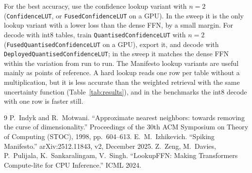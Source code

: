 \documentclass[11pt]{article}
\DeclareRobustCommand{\code}[1]{{\renewcommand{\_}{\textunderscore\allowbreak}\texttt{#1}}}
\begin{document}
For the best accuracy, use the confidence lookup variant with $n=2$ (\code{ConfidenceLUT}, or
\code{FusedConfidenceLUT} on a GPU). In the sweep it is the only lookup variant with a lower loss than the
dense FFN, by a small margin. For decode with int8 tables, train \code{QuantisedConfidenceLUT} with $n=2$
(\code{FusedQuantisedConfidenceLUT} on a GPU), export it, and decode with
\code{DeployedQuantisedConfidenceLUT}; in the sweep it matches the dense FFN within the variation from run
to run. The Manifesto lookup variants are useful mainly as points of reference. A hard lookup reads one
row per table without a multiplication, but it is less accurate than the weighted retrieval with the same
uncertainty function (Table~\ref{tab:results}), and in the benchmarks the int8 decode with one row is
faster still.

\begin{thebibliography}{9}\small\setlength{\itemsep}{1pt}
 P.~Indyk and R.~Motwani. ``Approximate nearest neighbors: towards removing the curse of
  dimensionality.'' Proceedings of the 30th ACM Symposium on Theory of Computing (STOC), 1998,
  pp.~604--613.
 E.~M.~Izhikevich. ``Spiking Manifesto.'' arXiv:2512.11843, v2, December 2025.
 Z.~Zeng, M.~Davies, P.~Pulijala, K.~Sankaralingam, V.~Singh. ``LookupFFN: Making
  Transformers Compute-lite for CPU Inference.'' ICML 2024.
\end{thebibliography}
\end{document}
